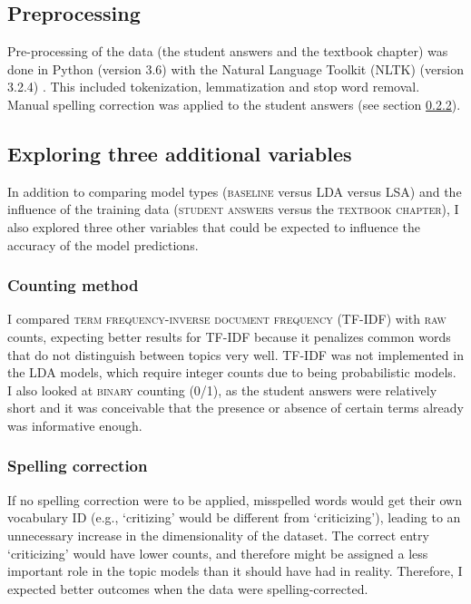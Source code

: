 \documentclass[a4paper,10pt,twoside]{article}
\begin{document}
\subsection{Preprocessing}
Pre-processing of the data (the student answers and the textbook chapter) was done in Python (version 3.6) with the Natural Language Toolkit (NLTK) (version 3.2.4) \cite{bird2009}. This included tokenization, lemmatization and stop word removal. Manual spelling correction was applied to the student answers (see section \ref{sec:spelling}).

\subsection{Exploring three additional variables}
\label{sec:exploring}
In addition to comparing model types (\textsc{baseline} versus LDA versus LSA) and the influence of the training data (\textsc{student answers} versus the \textsc{textbook chapter}), I also explored three other variables that could be expected to influence the accuracy of the model predictions.

\subsubsection{Counting method}
\label{sec:countingmethod}
I compared \textsc{term frequency-inverse document frequency} (TF-IDF) with \textsc{raw} counts, expecting better results for TF-IDF because it penalizes common words that do not distinguish between topics very well. TF-IDF was not implemented in the LDA models, which require integer counts due to being probabilistic models. I also looked at \textsc{binary} counting (0/1), as the student answers were relatively short and it was conceivable that the presence or absence of certain terms already was informative enough.

\subsubsection{Spelling correction}
\label{sec:spelling}
If no spelling correction were to be applied, misspelled words would get their own vocabulary ID (e.g., `critizing' would be different from `criticizing'), leading to an unnecessary increase in the dimensionality of the dataset. The correct entry `criticizing' would have lower counts, and therefore might be assigned a less important role in the topic models than it should have had in reality. Therefore, I expected better outcomes when the data were spelling-corrected.
\end{document}

